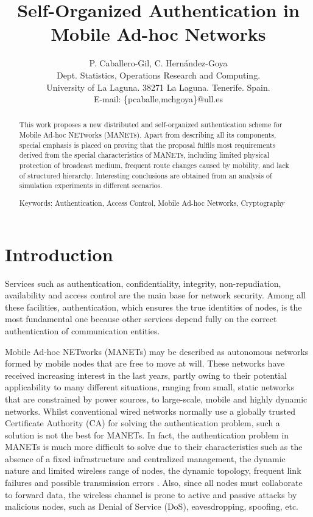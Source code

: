 \documentclass{article}
\begin{document}
\title{Self-Organized Authentication in Mobile Ad-hoc Networks}
\date{}
\author{P. Caballero-Gil, C. Hern\'andez-Goya\\
{\small Dept. Statistics, Operations Research and Computing. }\\
{\small University of La Laguna. 38271 La Laguna. Tenerife. Spain. }\\
{\small E-mail: \{pcaballe,mchgoya\}@ull.es } }

\maketitle

\begin{abstract}
This work proposes a new distributed and self-organized 
authentication scheme for Mobile Ad-hoc NETworks (MANETs). Apart
from describing  all its components, special emphasis is placed on
proving that the proposal fulfils most requirements derived
from the special characteristics of MANETs, including limited
physical protection of broadcast medium, frequent route changes
caused by mobility, and lack of structured hierarchy. Interesting
conclusions are obtained from an analysis of simulation
experiments in different scenarios.

Keywords: Authentication, Access Control, Mobile Ad-hoc Networks,
Cryptography
\end{abstract}

\section{Introduction}
\label{Sec:Intro}

Services such as authentication, confidentiality, integrity,
non-repudiation, availability and access control are the main base for network
security. Among all these facilities, authentication, which
ensures the true identities of nodes, is the most fundamental one
because other services depend fully on the correct authentication
of communication entities.

Mobile Ad-hoc NETworks (MANETs) may be described as autonomous
networks formed by mobile nodes that are free to move at will.
These networks have received increasing interest in the last
years, partly owing to their potential applicability to many
different situations, ranging from small, static networks that
are constrained by power sources, to large-scale, mobile and
highly dynamic networks. Whilst conventional wired networks
normally use a globally trusted Certificate Authority (CA) for
solving the authentication problem, such a solution is not the
best for MANETs. In fact, the authentication problem in MANETs is
much more difficult to solve due to their characteristics such as
the absence of a fixed infrastructure and centralized management,
the dynamic nature and limited wireless range of
nodes, the dynamic topology, frequent link failures and possible
transmission errors \cite{ATEDQ05} \cite{Wei04}. Also, since all nodes must collaborate to forward data, the wireless channel
is prone to active and passive attacks by malicious nodes, such as
Denial of Service (DoS), eavesdropping, spoofing, etc.
\end{document}
